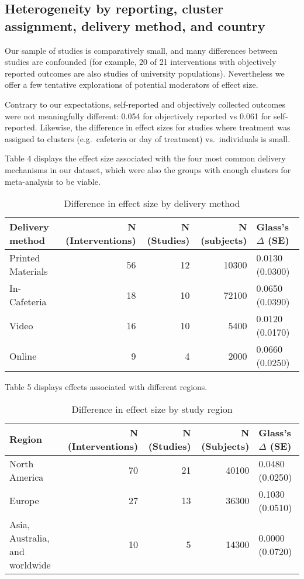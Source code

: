 \documentclass[sn-nature,pdflatex]{sn-jnl}
\begin{document}
\subsection{Heterogeneity by reporting, cluster assignment, delivery
method, and country}\label{sec2.10}

Our sample of studies is comparatively small, and many differences
between studies are confounded (for example, 20 of 21 interventions with
objectively reported outcomes are also studies of university
populations). Nevertheless we offer a few tentative explorations of
potential moderators of effect size.

Contrary to our expectations, self-reported and objectively collected
outcomes were not meaningfully different: 0.054 for objectively reported
vs 0.061 for self-reported. Likewise, the difference in effect sizes for
studies where treatment was assigned to clusters (e.g.~cafeteria or day
of treatment) vs.~individuals is small.

Table 4 displays the effect size associated with the four most common
delivery mechanisms in our dataset, which were also the groups with
enough clusters for meta-analysis to be viable.

\begin{table}[!h]
\centering
\caption{\label{tab:tab:table_four}Difference in effect size by delivery method}
\centering
\begin{tabular}[t]{lrrrl}
\toprule
Delivery method & N (Interventions) & N (Studies) & N (subjects) & Glass's $\Delta$ (SE)\\
\midrule
Printed Materials & 56 & 12 & 10300 & 0.0130 (0.0300)\\
In-Cafeteria & 18 & 10 & 72100 & 0.0650 (0.0390)\\
Video & 16 & 10 & 5400 & 0.0120 (0.0170)\\
Online & 9 & 4 & 2000 & 0.0660 (0.0250)\\
\bottomrule
\end{tabular}
\end{table}

Table 5 displays effects associated with different regions.

\begin{table}[!h]
\centering
\caption{\label{tab:tab:table_five}Difference in effect size by study region}
\centering
\begin{tabular}[t]{lrrrl}
\toprule
Region & N (Interventions) & N (Studies) & N (Subjects) & Glass's $\Delta$ (SE)\\
\midrule
North America & 70 & 21 & 40100 & 0.0480 (0.0250)\\
Europe & 27 & 13 & 36300 & 0.1030 (0.0510)\\
Asia, Australia, and worldwide & 10 & 5 & 14300 & 0.0000 (0.0720)\\
\bottomrule
\end{tabular}
\end{table}
\end{document}
